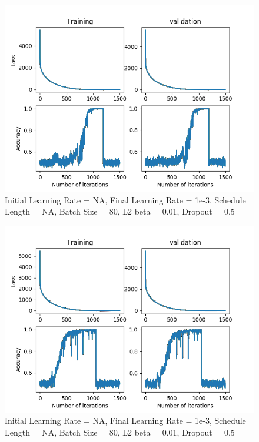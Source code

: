 \documentclass[12pt,reqno]{amsart}
\numberwithin{equation}{section}
\begin{document}
\begin{enumerate}
\begin{figure}[H]
\centering
\includegraphics[scale=0.6]{data_aug}
\caption{Initial Learning Rate = NA, Final Learning Rate = 1e-3, Schedule Length = NA, Batch Size = 80, L2 beta = 0.01, Dropout = 0.5}
\end{figure}

\begin{figure}[H]
\centering
\includegraphics[scale=0.6]{data_aug2}
\caption{Initial Learning Rate = NA, Final Learning Rate = 1e-3, Schedule Length = NA, Batch Size = 80, L2 beta = 0.01, Dropout = 0.5}
\end{figure}


\end{enumerate}
\end{document}
